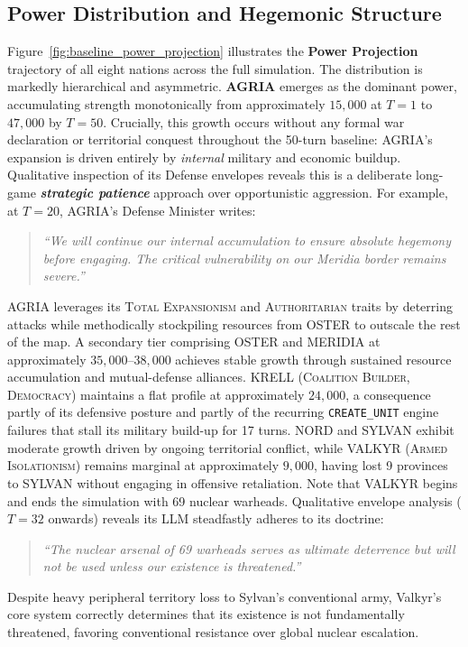 \subsection{Power Distribution and Hegemonic Structure}
Figure~\ref{fig:baseline_power_projection} illustrates the \textbf{Power Projection} trajectory of all eight nations across the full simulation. The distribution is markedly hierarchical and asymmetric. \textbf{AGRIA} emerges as the dominant power, accumulating strength monotonically from approximately $15{,}000$ at $T=1$ to $47{,}000$ by $T=50$. Crucially, this growth occurs without any formal war declaration or territorial conquest throughout the 50-turn baseline: AGRIA's expansion is driven entirely by \emph{internal} military and economic buildup. Qualitative inspection of its Defense envelopes reveals this is a deliberate long-game \textbf{\emph{strategic patience}} approach over opportunistic aggression. For example, at $T=20$, AGRIA's Defense Minister writes:
\begin{quote}
\textit{``We will continue our internal accumulation to ensure absolute hegemony before engaging. The critical vulnerability on our Meridia border remains severe.''}
\end{quote}
AGRIA leverages its \textsc{Total Expansionism} and \textsc{Authoritarian} traits by deterring attacks while methodically stockpiling resources from OSTER to outscale the rest of the map. A secondary tier comprising OSTER and MERIDIA at approximately $35{,}000$--$38{,}000$ achieves stable growth through sustained resource accumulation and mutual-defense alliances. KRELL (\textsc{Coalition Builder}, \textsc{Democracy}) maintains a flat profile at approximately $24{,}000$, a consequence partly of its defensive posture and partly of the recurring \texttt{CREATE\_UNIT} engine failures that stall its military build-up for 17 turns. NORD and SYLVAN exhibit moderate growth driven by ongoing territorial conflict, while VALKYR (\textsc{Armed Isolationism}) remains marginal at approximately $9{,}000$, having lost 9 provinces to SYLVAN without engaging in offensive retaliation. Note that VALKYR begins and ends the simulation with 69 nuclear warheads. Qualitative envelope analysis ($T=32$ onwards) reveals its LLM steadfastly adheres to its doctrine:
\begin{quote}
\textit{``The nuclear arsenal of 69 warheads serves as ultimate deterrence but will not be used unless our existence is threatened.''}
\end{quote}
Despite heavy peripheral territory loss to Sylvan's conventional army, Valkyr's core system correctly determines that its existence is not fundamentally threatened, favoring conventional resistance over global nuclear escalation.

